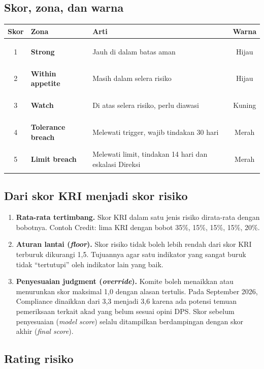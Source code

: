 \documentclass[11pt,a4paper]{article}
\newcommand{\tagG}{\colorbox{tintgreen}{\strut Hijau}}
\newcommand{\tagA}{\colorbox{tintamber}{\strut Kuning}}
\newcommand{\tagR}{\colorbox{tintred}{\strut Merah}}
\begin{document}
\subsection{Skor, zona, dan warna}

\begin{center}
\begin{tabularx}{\linewidth}{c>{\bfseries}p{3.2cm}Xc}
\toprule
Skor & Zona & Arti & Warna \\
\midrule
1 & Strong & Jauh di dalam batas aman & \tagG\\
2 & Within appetite & Masih dalam selera risiko & \tagG\\
3 & Watch & Di atas selera risiko, perlu diawasi & \tagA\\
4 & Tolerance breach & Melewati trigger, wajib tindakan 30 hari & \tagR\\
5 & Limit breach & Melewati limit, tindakan 14 hari dan eskalasi Direksi & \tagR\\
\bottomrule
\end{tabularx}
\end{center}

\subsection{Dari skor KRI menjadi skor risiko}

\begin{enumerate}
\item \textbf{Rata-rata tertimbang.} Skor KRI dalam satu jenis risiko dirata-rata dengan bobotnya. Contoh Credit: lima KRI dengan bobot 35\%, 15\%, 15\%, 15\%, 20\%.
\item \textbf{Aturan lantai (\emph{floor}).} Skor risiko tidak boleh lebih rendah dari skor KRI terburuk dikurangi 1,5. Tujuannya agar satu indikator yang sangat buruk tidak ``tertutupi'' oleh indikator lain yang baik.
\item \textbf{Penyesuaian judgment (\emph{override}).} Komite boleh menaikkan atau menurunkan skor maksimal 1,0 dengan alasan tertulis. Pada September 2026, Compliance dinaikkan dari 3{,}3 menjadi 3{,}6 karena ada potensi temuan pemeriksaan terkait akad yang belum sesuai opini DPS. Skor sebelum penyesuaian (\emph{model score}) selalu ditampilkan berdampingan dengan skor akhir (\emph{final score}).
\end{enumerate}

\subsection{Rating risiko}
\end{document}
